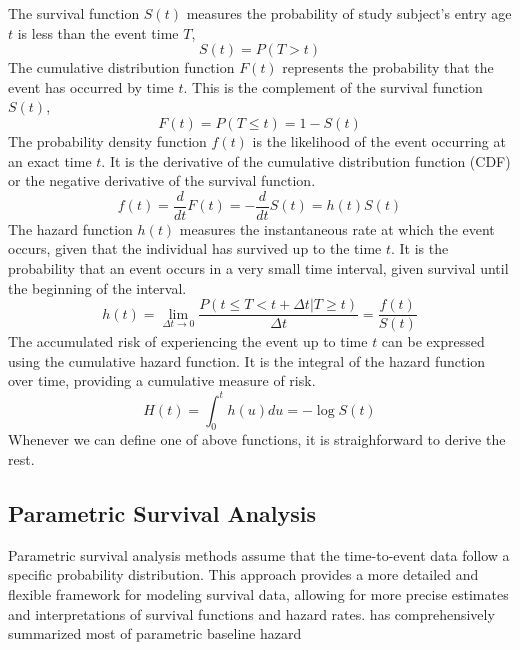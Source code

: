 The survival function $S(t)$ measures the probability of study subject's entry age $t$ is less than the event time $T$, 
\begin{equation} 
    S(t)=P(T>t)
\end{equation}
The cumulative distribution function $F(t)$ represents the probability that the event has occurred by time $t$. 
This is the complement of the survival function $S(t)$,
\begin{equation}
    F(t)=P(T\leq t)=1-S(t)
\end{equation}
The probability density function $f(t)$ is the likelihood of the event occurring at an exact time $t$. 
It is the derivative of the cumulative distribution function (CDF) or the negative derivative of the survival function. 
\begin{equation}
    f(t)=\frac{d}{dt}F(t)=-\frac{d}{dt}S(t)=h(t)S(t)
\end{equation}
The hazard function $h(t)$ measures the instantaneous rate at which the event occurs, given that the individual has survived up to the time $t$. 
It is the probability that an event occurs in a very small time interval, given survival until the beginning of the interval. 
\begin{equation}
    h(t)=\lim_{\Delta t\rightarrow 0}\frac{P(t\leq T<t+\Delta t|T\geq t)}{\Delta t}=\frac{f(t)}{S(t)}
\end{equation}
The accumulated risk of experiencing the event up to time $t$ can be expressed using the cumulative hazard function. 
It is the integral of the hazard function over time, providing a cumulative measure of risk. 
\begin{equation}
    H(t)=\int_0^t h(u)du=-\log S(t)
\end{equation}
Whenever we can define one of above functions, it is straighforward to derive the rest. 




\subsection{Parametric Survival Analysis}
Parametric survival analysis methods assume that the time-to-event data follow a specific probability distribution.
This approach provides a more detailed and flexible framework for modeling survival data, allowing for more precise estimates and interpretations of survival functions and hazard rates.
\citet{hosmer2008applied} has comprehensively summarized most of parametric baseline hazard